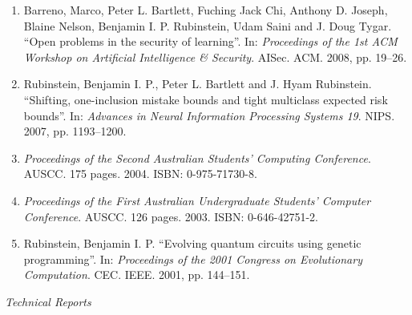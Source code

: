 \documentclass[a4paper,12pt]{article}
\begin{document}
\begin{enumerate}
\item Barreno, Marco, Peter L. Bartlett, Fuching Jack Chi, Anthony D. Joseph, Blaine Nelson, Benjamin I. P. Rubinstein, Udam Saini and J. Doug Tygar.
``Open problems in the security of learning''.
In: 
\emph{Proceedings of the 1st ACM Workshop on Artificial Intelligence \& Security}.
AISec.
ACM.
2008, pp. 19--26.

\item Rubinstein, Benjamin I. P., Peter L. Bartlett and J. Hyam Rubinstein.
``Shifting, one-inclusion mistake bounds and tight multiclass expected risk bounds''.
In: 
\emph{Advances in Neural Information Processing Systems 19}.
NIPS.
2007, pp. 1193--1200.

\item \emph{Proceedings of the Second Australian Students' Computing Conference}.
AUSCC.
175 pages.
2004.
ISBN: 0-975-71730-8.

\item \emph{Proceedings of the First Australian Undergraduate Students' Computer Conference}.
AUSCC.
126 pages.
2003.
ISBN: 0-646-42751-2.

\item Rubinstein, Benjamin I. P.
``Evolving quantum circuits using genetic programming''.
In: 
\emph{Proceedings of the 2001 Congress on Evolutionary Computation}.
CEC.
IEEE.
2001, pp. 144--151.


\setcounter{list}{\value{enumi}}
\end{enumerate}

\noindent\textit{Technical Reports}
\end{document}
